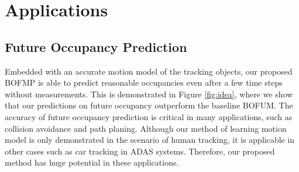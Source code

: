 

\section{Applications} \label{sec:application}

\subsection{Future Occupancy Prediction}

Embedded with an accurate motion model of the tracking objects, our proposed BOFMP is able to predict reasonable occupancies even after a few time steps without measurements. This is demonstrated in Figure \ref{fig:idea}, where we show that our predictions on future occupancy outperform the baseline BOFUM. The accuracy of future occupancy prediction is critical in many applications, such as collision avoidance and path planing. Although our method of learning motion model is only demonstrated in the scenario of human tracking, it is applicable in other cases such as car tracking in ADAS systems. Therefore, our proposed method has huge potential in these applications. 

